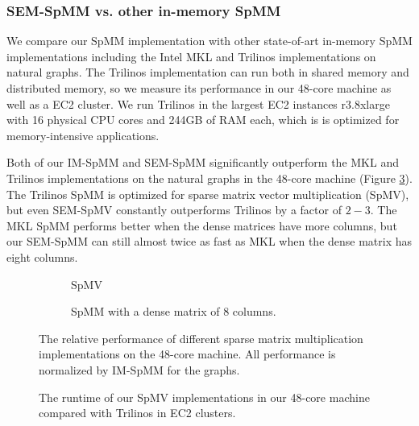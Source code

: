 \subsubsection{SEM-SpMM vs. other in-memory SpMM}

We compare our SpMM implementation with other state-of-art in-memory SpMM
implementations including the Intel MKL and Trilinos implementations on
natural graphs. The Trilinos implementation can run both in shared memory
and distributed memory, so we measure its performance in our 48-core machine
as well as a EC2 cluster. We run Trilinos in the largest EC2 instances r3.8xlarge
with 16 physical CPU cores and 244GB of RAM each, which is is optimized for
memory-intensive applications.

Both of our IM-SpMM and SEM-SpMM significantly outperform the MKL and Trilinos
implementations on the natural graphs in the 48-core machine (Figure \ref{perf:spmm}).
The Trilinos SpMM is optimized for sparse matrix vector multiplication (SpMV),
but even SEM-SpMV constantly outperforms Trilinos by a factor of $2-3$.
The MKL SpMM performs better when the dense matrices have more columns,
but our SEM-SpMM can still almost twice as fast as MKL when the dense matrix
has eight columns.

\begin{figure}[t!]
	\footnotesize
	\centering
	\begin{subfigure}[b]{0.5\textwidth}
		\centering
		
		\vspace{-10pt}
		\caption{SpMV}
		\label{perf:spmv}
	\end{subfigure}
	\begin{subfigure}[b]{0.5\textwidth}
		\centering
		
		\vspace{-10pt}
		\caption{SpMM with a dense matrix of 8 columns.}
		\label{perf:spmm8}
	\end{subfigure}
	\vspace{3pt}
	\caption{The relative performance of different sparse matrix multiplication
		implementations on the 48-core machine. All performance is normalized by
	IM-SpMM for the graphs.}
	\label{perf:spmm}
\end{figure}

\begin{figure}
	\begin{center}
		\footnotesize
		
		\caption{The runtime of our SpMV implementations in our 48-core machine
			compared with Trilinos in EC2 clusters.}
		\label{perf:ec2}
	\end{center}
\end{figure}


